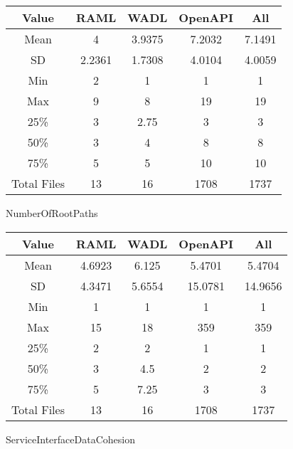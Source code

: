 \begin{center}
  \begin{tabular}{ c|c|c|c|c}
    \hline
     \label{table:WSIC}
     Value & RAML & WADL & OpenAPI & All \\ \hline
     Mean &4 &3.9375 &7.2032 &7.1491 \\ \hline
     SD &2.2361&1.7308&4.0104&4.0059 \\ \hline
     Min &2&1&1&1 \\ \hline
     Max &9&8&19&19 \\ \hline
     \rowcolor[HTML]{00FF00} 25\% &3&2.75&3&3 \\ \hline
     \rowcolor[HTML]{7FFF00} 50\% &3&4&8&8 \\ \hline
     \rowcolor[HTML]{FFFF00} 75\% &5&5&10&10 \\ \hline
     Total Files &13&16&1708&1737 \\ \hline
  \end{tabular}
 \end{center}

NumberOfRootPaths

\begin{center}
  \begin{tabular}{ c|c|c|c|c}
    \hline
     \label{table:WSIC}
     Value & RAML & WADL & OpenAPI & All \\ \hline
     Mean &4.6923 &6.125 &5.4701 &5.4704 \\ \hline
     SD &4.3471&5.6554&15.0781&14.9656 \\ \hline
     Min &1&1&1&1 \\ \hline
     Max &15&18&359&359 \\ \hline
     \rowcolor[HTML]{00FF00} 25\% &2&2&1&1 \\ \hline
     \rowcolor[HTML]{7FFF00} 50\% &3&4.5&2&2 \\ \hline
     \rowcolor[HTML]{FFFF00} 75\% &5&7.25&3&3 \\ \hline
     Total Files &13&16&1708&1737 \\ \hline
  \end{tabular}
 \end{center}

ServiceInterfaceDataCohesion

